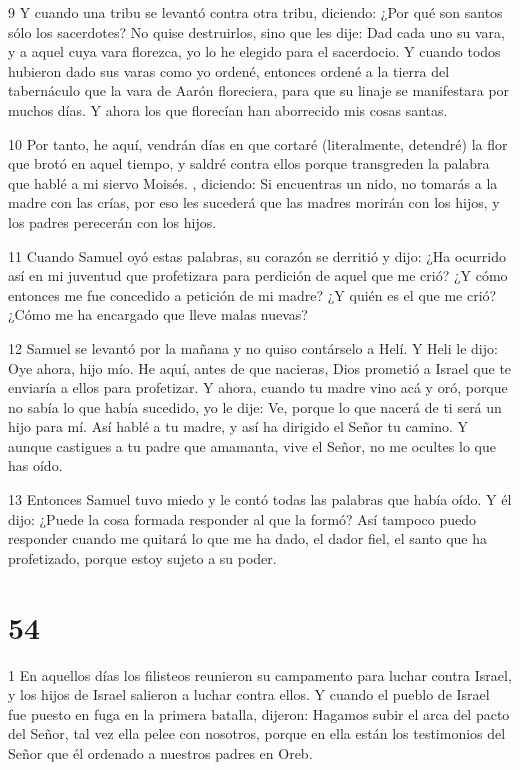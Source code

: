 \par 9 Y cuando una tribu se levantó contra otra tribu, diciendo: ¿Por qué son santos sólo los sacerdotes? No quise destruirlos, sino que les dije: Dad cada uno su vara, y a aquel cuya vara florezca, yo lo he elegido para el sacerdocio. Y cuando todos hubieron dado sus varas como yo ordené, entonces ordené a la tierra del tabernáculo que la vara de Aarón floreciera, para que su linaje se manifestara por muchos días. Y ahora los que florecían han aborrecido mis cosas santas.

\par 10 Por tanto, he aquí, vendrán días en que cortaré (literalmente, detendré) la flor que brotó en aquel tiempo, y saldré contra ellos porque transgreden la palabra que hablé a mi siervo Moisés. , diciendo: Si encuentras un nido, no tomarás a la madre con las crías, por eso les sucederá que las madres morirán con los hijos, y los padres perecerán con los hijos.

\par 11 Cuando Samuel oyó estas palabras, su corazón se derritió y dijo: ¿Ha ocurrido así en mi juventud que profetizara para perdición de aquel que me crió? ¿Y cómo entonces me fue concedido a petición de mi madre? ¿Y quién es el que me crió? ¿Cómo me ha encargado que lleve malas nuevas?

\par 12 Samuel se levantó por la mañana y no quiso contárselo a Helí. Y Heli le dijo: Oye ahora, hijo mío. He aquí, antes de que nacieras, Dios prometió a Israel que te enviaría a ellos para profetizar. Y ahora, cuando tu madre vino acá y oró, porque no sabía lo que había sucedido, yo le dije: Ve, porque lo que nacerá de ti será un hijo para mí. Así hablé a tu madre, y así ha dirigido el Señor tu camino. Y aunque castigues a tu padre que amamanta, vive el Señor, no me ocultes lo que has oído.

\par 13 Entonces Samuel tuvo miedo y le contó todas las palabras que había oído. Y él dijo: ¿Puede la cosa formada responder al que la formó? Así tampoco puedo responder cuando me quitará lo que me ha dado, el dador fiel, el santo que ha profetizado, porque estoy sujeto a su poder.



\chapter{54}

\par 1 En aquellos días los filisteos reunieron su campamento para luchar contra Israel, y los hijos de Israel salieron a luchar contra ellos. Y cuando el pueblo de Israel fue puesto en fuga en la primera batalla, dijeron: Hagamos subir el arca del pacto del Señor, tal vez ella pelee con nosotros, porque en ella están los testimonios del Señor que él ordenado a nuestros padres en Oreb.

